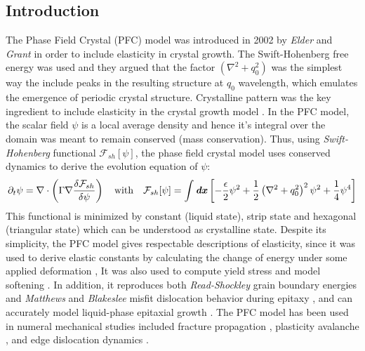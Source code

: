 \documentclass[11pt]{article}
\begin{document}
\subsection{Introduction}
The Phase Field Crystal (PFC) model was introduced in 2002 by \emph{Elder} and \emph{Grant} \parencite{elderModelingElasticity2002} in order to include elasticity in crystal growth. The Swift-Hohenberg free energy was used and they argued that the factor $(\nabla^2+q_0^2)$ was the simplest way the include peaks in the resulting structure at $q_0$ wavelength, which emulates the emergence of periodic crystal structure. Crystalline pattern was the key ingredient to include elasticity in the crystal growth model \parencite{elderModelingelastic2004}. In the PFC model, the scalar field $\psi$ is a local average density and hence it's integral over the domain was meant to remain conserved (mass conservation). Thus, using \emph{Swift-Hohenberg} functional $\mathcal{F}_{sh}[\psi]$, the phase field crystal model uses conserved dynamics to derive the evolution equation of $\psi$:
\begin{equation}
    \partial_t \psi =  \nabla \cdot \left(\Gamma \nabla \frac{\delta \mathcal{F}_{sh}}{\delta \psi}\right) \quad \text{with} \quad \mathcal{F}_{sh}[\psi] = \int \bm{\mathit{dx}} \left[ - \frac{\epsilon}{2} \psi ^2 + \frac{1}{2}\left( \nabla^2+q_0^2\right)^2 \psi^2  + \frac{1}{4} \psi^4 \right]
\end{equation}
This functional is minimized by constant (liquid state), strip state and hexagonal (triangular state) which can be understood as crystalline state. Despite its simplicity, the PFC model gives respectable descriptions of elasticity, since it was used to derive elastic constants by calculating the change of energy under some applied deformation \autocite{elderModelingElasticity2002}, It was also used to compute yield stress and model softening \parencite{elderModelingelastic2004}. In addition, it reproduces both \emph{Read-Shockley} grain boundary energies and \emph{Matthews} and \emph{Blakeslee} misfit dislocation behavior during epitaxy \parencite{elderModelingElasticity2002}, and can accurately model liquid-phase epitaxial growth \parencite{elderModelingelastic2004}. The PFC model has been used in numeral mechanical studies included fracture propagation \parencite{elderModelingElasticity2002}, plasticity avalanche \parencite{chanPlasticityDislocation2010}, and edge dislocation dynamics \parencite{elderPhasefieldcrystal2007}. \\
\end{document}
